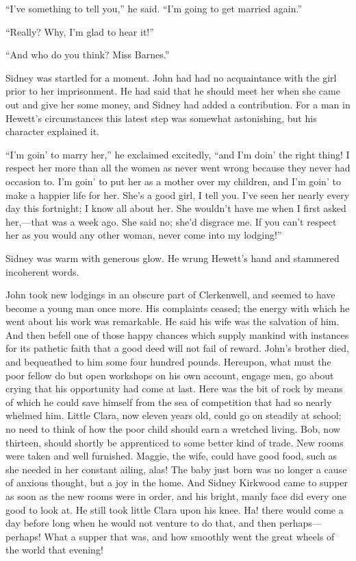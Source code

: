 ``I've something to tell you,'' he said. ``I'm going to get married
again.''

``Really? Why, I'm glad to hear it!''

``And who do you think? Miss Barnes.''

Sidney was startled for a moment. John had had no acquaintance with the
girl prior to her imprisonment. He had said that he should meet her when
she came out and give her some money, and Sidney had added a
contribution. For a man in Hewett's circumstances this latest step was
{}somewhat astonishing, but his character explained it.

``I'm goin' to marry her,'' he exclaimed excitedly, ``and I'm doin' the
right thing! I respect her more than all the women as never went wrong
because they never had occasion to. I'm goin' to put her as a mother
over my children, and I'm goin' to make a happier life for her. She's a
good girl, I tell you. I've seen her nearly every day this fortnight; I
know all about her. She wouldn't have me when I first asked her,---that
was a week ago. She said no; she'd disgrace me. If you can't respect her
as you would any other woman, never come into my lodging!''

Sidney was warm with generous glow. He wrung Hewett's hand and stammered
incoherent words.

John took new lodgings in an obscure part of Clerkenwell, and seemed to
have become a young man once more. His complaints ceased; the energy
with which he went about his work was remarkable. He said his wife {}was
the salvation of him. And then befell one of those happy chances which
supply mankind with instances for its pathetic faith that a good deed
will not fail of reward. John's brother died, and bequeathed to him some
four hundred pounds. Hereupon, what must the poor fellow do but open
workshops on his own account, engage men, go about crying that his
opportunity had come at last. Here was the bit of rock by means of which
he could save himself from the sea of competition that had so nearly
whelmed him. Little Clara, now eleven years old, could go on steadily at
school; no need to think of how the poor child should earn a wretched
living. Bob, now thirteen, should shortly be apprenticed to some better
kind of trade. New rooms were taken and well furnished. Maggie, the
wife, could have good food, such as she needed in her constant ailing,
alas! The baby just born was no longer a cause of anxious thought, but a
joy in the home. And Sidney Kirkwood came to supper as soon as the new
rooms were in order, and his bright, {}manly face did every one good to
look at. He still took little Clara upon his knee. Ha! there would come
a day before long when he would not venture to do that, and then
perhaps---perhaps! What a supper that was, and how smoothly went the
great wheels of the world that evening!

